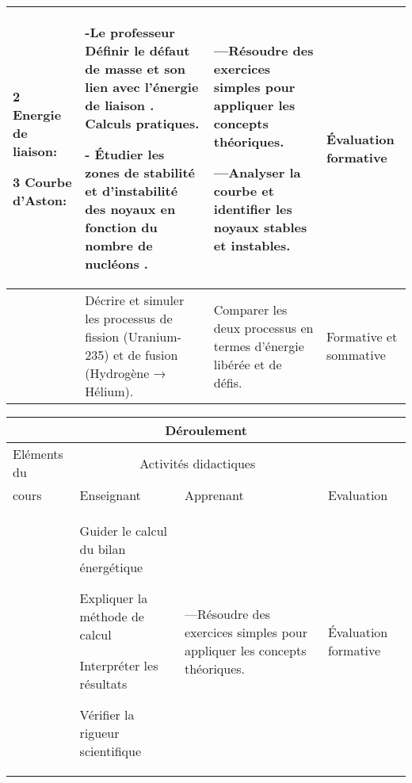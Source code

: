 \documentclass[13pt]{article}
\begin{document}
\begin{center}
\begin{tabular}{|p{}||p{}||p{}||p{}|}
\color{blue}2 Energie de liaison:
\vspace{0.5cm}

\color{blue}3 Courbe d’Aston:

				  &
-Le professeur 
Définir le défaut de masse et son lien avec l’énergie de liaison . Calculs pratiques.

-	Étudier les zones de stabilité et d’instabilité des noyaux en fonction du nombre de nucléons .
				  &
				  ---Résoudre des exercices simples pour appliquer les concepts théoriques. 

          ---Analyser la courbe et identifier les noyaux stables et instables.	
				  & 
	Évaluation formative			  
  \\\hline

\color{red}{III  Fission et fusion nucléaire }

&
Décrire et simuler les processus de fission (Uranium-235) et de fusion (Hydrogène → Hélium).
& 
Comparer les deux processus en termes d’énergie libérée et de défis.
&Formative et sommative
\\\hline





\end{tabular}
\end{center}


\begin{center}
	 \begin{tabular}{|p{}||p{}||p{}||p{}|}
\hline
\multicolumn{4}{|c|}{Déroulement}\\\hline
Eléments du & \multicolumn{2}{c||}{Activités didactiques} &  \\\cline{2-3}
cours & Enseignant & Apprenant & Evaluation\\\hline

\color{red}{IV Le bilan massique et énergétique d’une réaction nucléaire :}

				  &

Guider le calcul du bilan énergétique

Expliquer la méthode de calcul

Interpréter les résultats

Vérifier la rigueur scientifique

				  &


          —Résoudre des exercices simples pour
appliquer les concepts théoriques.
				  & 
	Évaluation formative\\\hline 
\end{tabular}
\end{center}
\end{document}

